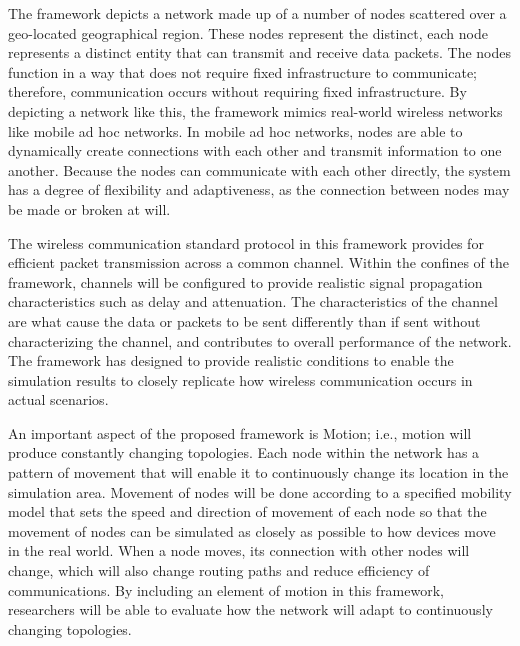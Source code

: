 \documentclass[a4paper,fleqn]{cas-dc}
\numberwithin{equation}{section}
\begin{document}
The framework depicts a network made up of a number of nodes scattered over a geo-located geographical region. These nodes represent the distinct, each node represents a distinct entity that can transmit and receive data packets. The nodes function in a way that does not require fixed infrastructure to communicate; therefore, communication occurs without requiring fixed infrastructure. By depicting a network like this, the framework mimics real-world wireless networks like mobile ad hoc networks. In mobile ad hoc networks, nodes are able to dynamically create connections with each other and transmit information to one another. Because the nodes can communicate with each other directly, the system has a degree of flexibility and adaptiveness, as the connection between nodes may be made or broken at will.


The wireless communication standard protocol in this framework provides for efficient packet transmission across a common channel. Within the confines of the framework, channels will be configured to provide realistic signal propagation characteristics such as delay and attenuation. The characteristics of the channel are what cause the data or packets to be sent differently than if sent without characterizing the channel, and contributes to overall performance of the network. The framework has designed to provide realistic conditions to enable the simulation results to closely replicate how wireless communication occurs in actual scenarios.

An important aspect of the proposed framework is Motion; i.e., motion will produce constantly changing topologies. Each node within the network has a pattern of movement that will enable it to continuously change its location in the simulation area. Movement of nodes will be done according to a specified mobility model that sets the speed and direction of movement of each node so that the movement of nodes can be simulated as closely as possible to how devices move in the real world. When a node moves, its connection with other nodes will change, which will also change routing paths and reduce efficiency of communications. By including an element of motion in this framework, researchers will be able to evaluate how the network will adapt to continuously changing topologies.
\end{document}
